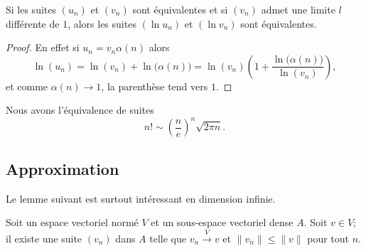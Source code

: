 \begin{lemma}
    Si les suites \( (u_n)\) et \( (v_n)\) sont équivalentes et si \( (v_n)\) admet une limite \( l\) différente de \( 1\), alors les suites \( (\ln u_n)\) et \( (\ln v_n)\) sont équivalentes.
\end{lemma}

\begin{proof}
    En effet si \( u_n=v_n\alpha(n)\) alors
    \begin{equation}
        \ln(u_n)=\ln(v_n)+\ln\big( \alpha(n) \big)=\ln(v_n)\left( 1+\frac{ \ln\big( \alpha(n) \big) }{ \ln(v_n) } \right),
    \end{equation}
    et comme \( \alpha(n)\to 1\), la parenthèse tend vers \( 1\).
\end{proof}

\begin{lemma}        \label{LemCEoBqrP}
    Nous avons l'équivalence de suites
    \begin{equation}
        n!\sim \left( \frac{ n }{ e } \right)^n\sqrt{2\pi n}.
    \end{equation}
\end{lemma}

\subsection{Approximation}

Le lemme suivant est surtout intéressant en dimension infinie.
\begin{lemma}
    Soit un espace vectoriel normé \( V\) et un sous-espace vectoriel dense \( A\). Soit \( v\in V\); il existe une suite \( (v_n)\) dans \( A\) telle que \( v_n\stackrel{V}{\longrightarrow}v\) et \( \| v_n \|\leq \| v \|\) pour tout \( n\).
\end{lemma}

